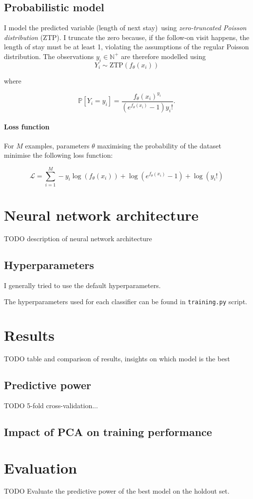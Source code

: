 \documentclass[10pt, twocolumn]{article}
\begin{document}
\subsection{Probabilistic model}

I model the predicted variable (length of next stay) using \textit{zero-truncated Poisson distribution} (ZTP). I truncate the zero because, if the follow-on visit happens, the length of stay must be at least 1, violating the assumptions of the regular Poisson distribution. The observations $y_i \in \mathbb{N}^+$ are therefore modelled using \[Y_i \sim \mathrm{ZTP}(f_\theta(x_i))\]

where 

\begin{equation*}
	\mathbb{P}[Y_i = y_i] = \frac{f_\theta(x_i)^{y_i}}{(e^{f_\theta(x_i)} - 1)y_i!}.
\end{equation*}

\paragraph{Loss function} For $M$ examples, parameters $\theta$ maximising the probability of the dataset minimise the following loss function:

\begin{equation*}
	\mathcal{L} = \sum\limits_{i=1}^{M} -y_i \log(f_\theta(x_i)) + \log(e^{f_\theta(x_i)} - 1) + \log(y_i!)
\end{equation*}



\section{Neural network architecture}

TODO description of neural network architecture


\subsection{Hyperparameters}
I generally tried to use the default hyperparameters. 

The hyperparameters used for each classifier can be found in \texttt{training.py} script.

\section{Results}
TODO table and comparison of results, insights on which model is the best
\subsection{Predictive power}
TODO 5-fold cross-validation... 

\subsection{Impact of PCA on training performance}

\section{Evaluation}
TODO Evaluate the predictive power of the best model on the holdout set.


\medskip
 


\end{document}

